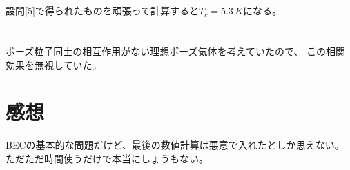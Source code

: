 \documentclass[../ap_2013.tex]{subfiles}
\begin{document}
\section{}
設問[5]で得られたものを頑張って計算すると\(T_c=5.3\,\si{K}\)になる。

\section{}
ボーズ粒子同士の相互作用がない理想ボーズ気体を考えていたので、
この相関効果を無視していた。


\section*{感想}
BECの基本的な問題だけど、最後の数値計算は悪意で入れたとしか思えない。ただただ時間使うだけで本当にしょうもない。
\end{document}
